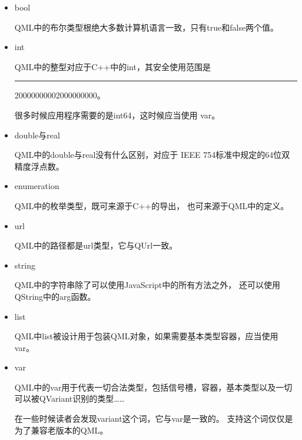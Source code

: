 \begin{itemize}

\item bool

QML中的布尔类型根绝大多数计算机语言一致，只有true和false两个值。
\item int

QML中的整型对应于C{\sourcefonttwo{}+}{\sourcefonttwo{}+}中的int，其安全使用范围是
\hspace{0.05em}\rule[0.7ex]{0.4em}{0.65pt}\hspace{0.05em}2000000000\raisebox{0.16ex}{\sourcefonttwo\~{}}2000000000。

很多时候应用程序需要的是int64，这时候应当使用
var。

\item double与real

QML中的double与real没有什么区别，对应于
IEEE 754标准中规定的64位双精度浮点数。
\item enumeration

QML中的枚举类型，既可来源于C{\sourcefonttwo{}+}{\sourcefonttwo{}+}的导出，
也可来源于QML中的定义。
\item url

QML中的路径都是url类型，它与QUrl一致。
\item string

QML中的字符串除了可以使用JavaScript中的所有方法之外，
还可以使用QString中的arg函数。
\item list

QML中list被设计用于包装QML对象，如果需要基本类型容器，应当使用var。
\item var

QML中的var用于代表一切合法类型，包括信号槽，容器，基本类型以及一切
可以被QVariant识别的类型……

在一些时候读者会发现variant这个词，它与var是一致的。
支持这个词仅仅是为了兼容老版本的QML。

\end{itemize}









